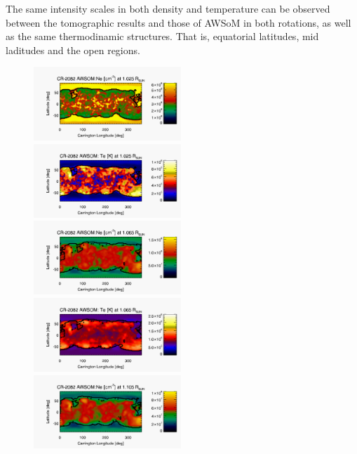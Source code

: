 \documentclass[namedreferences]{solarphysics}
\def\diego#1{\textcolor{red}{#1}}
\begin{document}
\begin{article}

The same intensity scales in both density and temperature can be observed between the tomographic results and those of AWSoM in both rotations, as well as the same thermodinamic structures. That is, equatorial latitudes, mid laditudes and the open regions.

\begin{figure}[h!]
\begin{center}
\includegraphics[width=0.495\textwidth]{figs/map_Ne_awsom_2082_185_short_1025_Rsun.pdf}
\includegraphics[width=0.495\textwidth]{figs/map_Te_awsom_2082_185_short_1025_Rsun.pdf}
\includegraphics[width=0.495\textwidth]{figs/map_Ne_awsom_2082_185_short_1065_Rsun.pdf}
\includegraphics[width=0.495\textwidth]{figs/map_Te_awsom_2082_185_short_1065_Rsun.pdf}
\includegraphics[width=0.495\textwidth]{figs/map_Ne_awsom_2082_185_short_1105_Rsun.pdf}

\end{center}
\end{figure}
\end{article}
\end{document}
